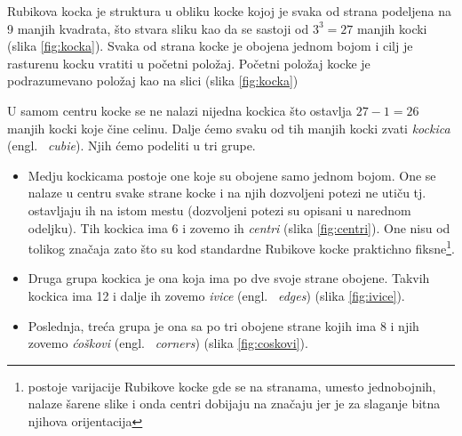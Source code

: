 \documentclass[a4paper]{article}
\begin{document}
Rubikova kocka je struktura u obliku kocke kojoj je svaka od strana podeljena na 9 manjih kvadrata, što stvara sliku kao da se sastoji od $3^3 = 27$ manjih kocki (slika \ref{fig:kocka}).
Svaka od strana kocke je obojena jednom bojom i cilj je rasturenu kocku vratiti u početni položaj. Početni položaj kocke je podrazumevano položaj kao na slici (slika \ref{fig:kocka})

U samom centru kocke se ne nalazi nijedna kockica što ostavlja $27 - 1 = 26$ manjih kocki koje čine celinu. Dalje ćemo svaku od tih manjih kocki zvati \textit{kockica} (engl. ~{\em cubie}).
Njih ćemo podeliti u tri grupe.    
    
    \begin{figure}[h]
        \centering
        \caption{}
        \label{fig:kockice}
    \end{figure}
    
\begin{itemize}
\item Medju kockicama postoje one koje su obojene samo jednom bojom.
    One se nalaze u centru svake strane kocke i na njih dozvoljeni potezi ne utiču tj. ostavljaju ih na istom mestu (dozvoljeni potezi su opisani u narednom odeljku).
    Tih kockica ima 6 i zovemo ih \textit{centri} (slika \ref{fig:centri}). One nisu od tolikog značaja zato što su kod standardne Rubikove kocke praktichno fiksne\footnote{postoje varijacije Rubikove kocke gde se na stranama, umesto jednobojnih, nalaze šarene slike i onda centri dobijaju na značaju jer je za slaganje bitna njihova orijentacija}.
\item Druga grupa kockica je ona koja ima po dve svoje strane obojene.
    Takvih kockica ima 12 i dalje ih zovemo \textit{ivice} (engl. ~{\em edges}) (slika \ref{fig:ivice}).
\item Poslednja, treća grupa je ona sa po tri obojene strane kojih ima 8 i njih zovemo \textit{ćoškovi} (engl. ~{\em corners}) (slika \ref{fig:coskovi}).
\end{itemize} 
\end{document}
